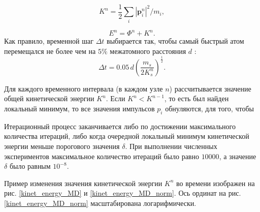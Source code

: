 \begin{equation}
\label{LF4}
K^n = \dfrac{1}{2} \sum_{i} |\mathbf{p}^{n}_i|^2/m_i,
\end{equation}

\begin{equation}
\label{LF5}
E^n = {\Phi}^n + K^n .
\end{equation}
Как правило, временной шаг $\Delta t$ выбирается так, чтобы самый быстрый атом перемещался не более чем на $5\%$ межатомного расстояния $d$ \cite{Eckstein1991}:
\begin{equation}
\label{LF6}
\Delta t = 0.05 \, d \left( \dfrac{m_s}{2 K_s^n} \right)^{\frac{1}{2}}.
\end{equation}

Для каждого временного интервала (в каждом узле $n$) рассчитывается значение общей кинетической энергии $K^n$.
Если $K^n < K^{n-1}$, то есть был найден локальный минимум, %
то все значения импульсов $p_{i}$ обнуляются, для того, чтобы %

Итерационный процесс заканчивается либо по достижении максимального количества итераций,
либо когда очередной локальный минимум кинетической энергии меньше порогового значения $\delta$.
При выполнении численных экспериментов максимальное количество итераций было равно $10000$,
а значение $\delta$ было равным $10^{-8}$.

Пример изменения значения кинетической энергии $K^n$ во времени изображен на
рис. \ref{kinet_energy_MD} и \ref{kinet_energy_MD_norm}.
Ось ординат на рис. \ref{kinet_energy_MD_norm} масштабирована логарифмически.

